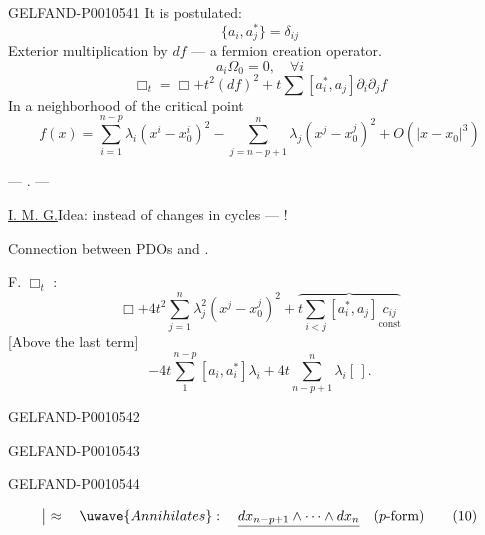 \begin{GelfandAdjacentEvidence}{GELFAND-P001054}{1}
It is postulated:
\begin{equation*}
\{a_i,a_j^*\}=\delta_{ij}
\tag{5}
\end{equation*}
Exterior multiplication by $df$ — a fermion creation operator.
\begin{equation*}
a_i\Omega_0=0,\quad\forall i
\tag{6}
\end{equation*}
\begin{equation*}
\Box_t=\Box+t^2(df)^2+t\sum[a_i^*,a_j]\partial_i\partial_jf
\tag{7}
\end{equation*}
In a neighborhood of the critical point
\begin{equation*}
f(x)=\sum_{i=1}^{n-p}\lambda_i(x^i-x_0^i)^2
-\sum_{j=n-p+1}^{n}\lambda_j(x^j-x_0^j)^2
+O(|x-x_0|^3)
\tag{8}
\end{equation*}
\begin{center}— . —\end{center}

\underline{I. M. G.}\quad Idea: instead of changes in cycles — !

Connection between PDOs and .

F.\quad{} $\Box_t$ :
\begin{equation*}
\Box+4t^2\sum_{j=1}^{n}\lambda_j^2(x^j-x_0^j)^2+
\overbrace{t\sum_{i<j}[a_i^*,a_j]\underset{\text{const}}{c_{ij}}}
\tag{9}
\end{equation*}
[Above the last term]
\[
-4t\sum_{1}^{n-p}[a_i,a_i^*]\lambda_i
+4t\sum_{n-p+1}^{n}\lambda_i[\,].
\]
\end{GelfandAdjacentEvidence}
\begin{GelfandAdjacentEvidence}{GELFAND-P001054}{2}

\end{GelfandAdjacentEvidence}
\begin{GelfandAdjacentEvidence}{GELFAND-P001054}{3}

\end{GelfandAdjacentEvidence}
\begin{GelfandAdjacentEvidence}{GELFAND-P001054}{4}

\begin{equation*}
\bigm|\ \approx\quad\uwave{Annihilates}:\quad
\underline{dx_{n-p+1}\wedge\cdots\wedge dx_n}\quad(p\text{-form})
\tag{10}
\end{equation*}
\end{GelfandAdjacentEvidence}
